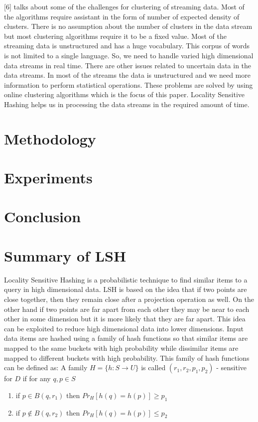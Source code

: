 \documentclass{article} %
\begin{document}
 [6] talks about some of the challenges for clustering of streaming data. Most of the algorithms require assistant in the form of number of expected density of clusters. There is no assumption about the number of clusters in the data stream but most clustering algorithms require it to be a fixed value. Most of the streaming data is unstructured and has a huge vocabulary. This corpus of words is not limited to a single language. So, we need to handle varied high dimensional data streams in real time. There are other issues related to uncertain data in the data streams. In most of the streams the data is unstructured and we need more information to perform statistical operations. These problems are solved by using online clustering algorithms which is the focus of this paper. Locality Sensitive Hashing helps us in processing the data streams in the required amount of time.

\section{Methodology}
\section{Experiments}
\section{Conclusion}

\section{Summary of LSH}
\label{sec:LSH}
Locality Sensitive Hashing is a probabilistic technique to find similar items to a query in high dimensional data. LSH is based on the idea that if two points are close together, then they remain close after a projection operation as well. On the other hand if two points are far apart from each other they may be near to each other in some dimension but it is more likely that they are far apart. This idea can be exploited to reduce high dimensional data into lower dimensions. Input data items are hashed using a family of hash functions so that similar items are mapped to the same buckets with high probability while dissimilar items are mapped to different buckets with high probability. This family of hash functions can be defined as: \newline
A family $H = \{h: S \rightarrow U\} $ is called $ (r_1,r_2,p_1,p_2 ) $ - sensitive for $D$ if for any $ q, p \in S$
\begin{enumerate}
\item if $ p \in B(q, r_1) $ then $ Pr_H[h(q)=h(p)] \geq p_1 $
\item if $ p \notin B(q, r_2) $ then $ Pr_H[h(q)=h(p)] \leq p_2 $
\end{enumerate}
\end{document}
